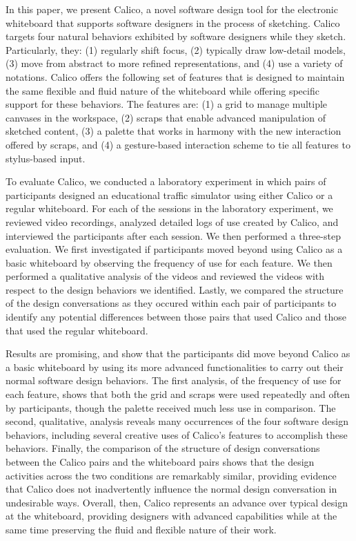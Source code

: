 In this paper, we present Calico, a novel software design tool for the electronic whiteboard that supports software designers in the process of sketching. Calico targets four natural behaviors exhibited by software designers while they sketch. Particularly, they: (1) regularly shift focus, (2) typically draw low-detail models, (3) move from abstract to more refined representations, and (4) use a variety of notations. Calico offers the following set of features that is designed to maintain the same flexible and fluid nature of the whiteboard while offering specific support for these behaviors. The features are: (1) a grid to manage multiple canvases in the workspace, (2) scraps that enable advanced manipulation of sketched content, (3) a palette that works in harmony with the new interaction offered by scraps, and (4) a gesture-based interaction scheme to tie all features to stylus-based input. 

To evaluate Calico, we conducted a laboratory experiment in which pairs of participants designed an educational traffic simulator using either Calico or a regular whiteboard. For each of the sessions in the laboratory experiment, we reviewed video recordings, analyzed detailed logs of use created by Calico, and interviewed the participants after each session. We then performed a three-step evaluation. We first investigated if participants moved beyond using Calico as a basic whiteboard by observing the frequency of use for each feature. We then performed a qualitative analysis of the videos and reviewed the videos with respect to the design behaviors we identified. Lastly, we compared the structure of the design conversations as they occured within each pair of participants to identify any potential differences between those pairs that used Calico and those that used the regular whiteboard.

Results are promising, and show that the participants did move beyond Calico as a basic whiteboard by using its more advanced functionalities to carry out their normal software design behaviors. The first analysis, of the frequency of use for each feature, shows that both the grid and scraps were used repeatedly and often by participants, though the palette received much less use in comparison. The second, qualitative, analysis reveals many occurrences of the four software design behaviors, including several creative uses of Calico's features to accomplish these behaviors. Finally, the comparison of the structure of design conversations between the Calico pairs and the whiteboard pairs shows that the design activities across the two conditions are remarkably similar, providing evidence that Calico does not inadvertently influence the normal design conversation in undesirable ways. Overall, then, Calico represents an advance over typical design at the whiteboard, providing designers with advanced capabilities while at the same time preserving the fluid and flexible nature of their work.


